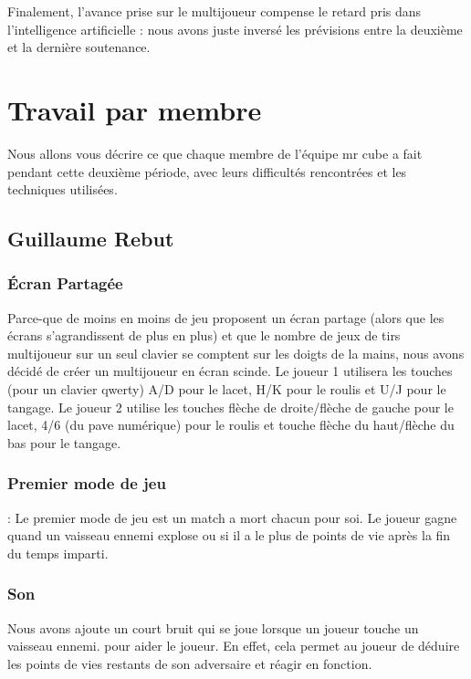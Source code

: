 \documentclass[10pt, titlepage]{report}
\begin{document}
Finalement, l'avance prise sur le multijoueur compense le retard pris dans l'intelligence artificielle : nous avons juste inversé les prévisions entre la deuxième et la dernière soutenance.

\chapter{Travail par membre}
Nous allons vous décrire ce que chaque membre de l'équipe mr cube a fait pendant cette deuxième période, avec leurs difficultés rencontrées et les techniques utilisées.

\section{Guillaume Rebut}

\subsection{Écran Partagée} 
 Parce-que de moins en moins de jeu proposent un écran partage (alors que les écrans s'agrandissent de plus en plus) et que le nombre de jeux de tirs multijoueur sur un seul clavier se comptent sur les doigts de la mains, nous avons décidé de créer un multijoueur en écran scinde.
Le joueur 1 utilisera les touches (pour un clavier qwerty) A/D pour le lacet, H/K pour le roulis et U/J pour le tangage. Le joueur 2 utilise les touches flèche de droite/flèche de gauche pour le lacet, 4/6 (du pave numérique) pour le roulis et touche flèche du haut/flèche du bas pour le tangage. \\

\subsection{Premier mode de jeu} : Le premier mode de jeu est un match a mort chacun pour soi. Le joueur gagne quand un vaisseau ennemi explose ou si il a le plus de points de vie après la fin du temps imparti.\\
 
\subsection{Son} 
 Nous avons ajoute un court bruit qui se joue lorsque un joueur touche un vaisseau ennemi. pour aider le joueur. En effet, cela permet au joueur de déduire les points de vies restants de son adversaire et réagir en fonction.\\
\end{document}
